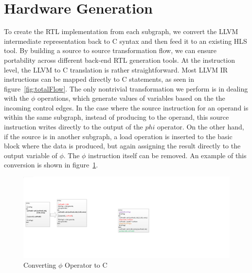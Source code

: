 \section{Hardware Generation}

To create the RTL implementation from each subgraph,
we convert the LLVM intermediate representation back to C
syntax and then feed it to an existing HLS tool. By building a
source to source transformation flow, we can ensure portability
across different back-end RTL generation tools.
At the instruction level, the LLVM to C translation is rather
straightforward. Most LLVM IR instructions can be mapped
directly to C statements, as seen in figure~\ref{fig:totalFlow}. The only nontrivial
transformation we perform is in dealing with the $\phi$ operations, which generate
 values of variables based on the the incoming control edges.  In the case where the source instruction for an operand is within the same subgraph, instead of
 producing to the operand, this source instruction writes directly to the output
 of the $phi$ operator.
 On the other hand, if the source
is in another subgraph, a load operation is inserted to the basic block
where the data is produced, but again assigning the result directly
to the output variable of $\phi$. The $\phi$
instruction itself can be removed. An example of this conversion is
shown in figure~\ref{fig:phi2c}.


\begin{figure}[htp]
\begin{center}
\includegraphics[width=0.7\linewidth]{chap3fig/SSA2C.pdf}
\caption{Converting $\phi$ Operator to C
\label{fig:phi2c}}
\end{center}
\end{figure}

